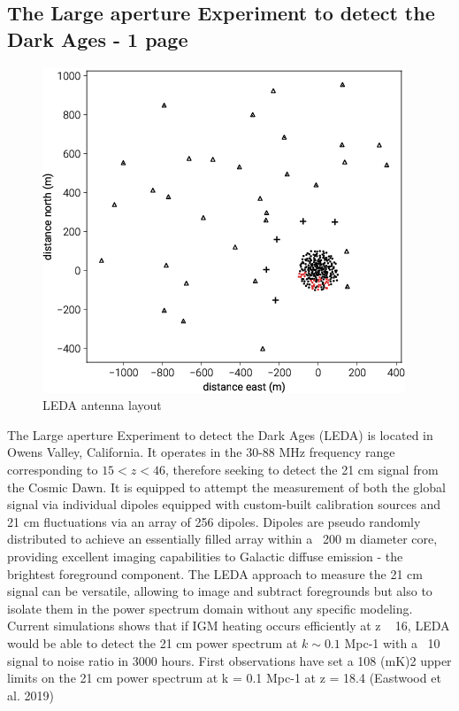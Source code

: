 \subsection{The Large aperture Experiment to detect the Dark Ages - 1 page}
\begin{figure}[]
\begin{center}
\includegraphics[width=1.\textwidth]{Koopmans_Bernardi/lwa_layout}
\end{center}
\caption{LEDA antenna layout}
\label{fig:fig_leda}
\end{figure}
The Large aperture Experiment to detect the Dark Ages (LEDA) is located in Owens Valley, California. It operates in the 30-88 MHz frequency range corresponding to $15 < z < 46$, therefore seeking to detect the 21 cm signal from the Cosmic Dawn. It is equipped to attempt the measurement of both the global signal via individual dipoles equipped with custom-built calibration sources and 21 cm fluctuations via an array of 256 dipoles. Dipoles are pseudo randomly distributed to achieve an essentially filled array within a ~200 m diameter core, providing excellent imaging capabilities to Galactic diffuse emission - the brightest foreground component. The LEDA approach to measure the 21 cm signal can be versatile, allowing to image and subtract foregrounds but also to isolate them in the power spectrum domain without any specific modeling. Current simulations shows that if IGM heating occurs efficiently at z ~ 16, LEDA would be able to detect the 21 cm power spectrum at $k \sim 0.1$ Mpc-1 with a ~10 signal to noise ratio in 3000 hours. First observations have set a 108 (mK)2 upper limits on the 21 cm power spectrum at k = 0.1 Mpc-1 at z = 18.4 (Eastwood et al. 2019)


